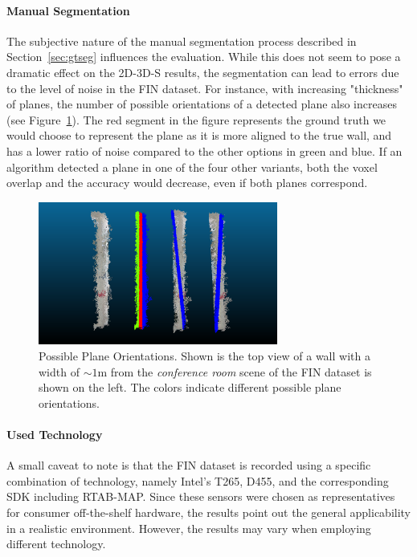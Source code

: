 \documentclass[main.tex]{subfiles}
\begin{document}
\paragraph{Manual Segmentation}
The subjective nature of the manual segmentation process described in Section~\ref{sec:gtseg} influences the evaluation. While this does not seem to pose a dramatic effect on the 2D-3D-S results, the segmentation can lead to errors due to the level of noise in the FIN dataset. For instance, with increasing "thickness" of planes, the number of possible orientations of a detected plane also increases (see Figure~\ref{fig:poss-planes}). The red segment in the figure represents the ground truth we would choose to represent the plane as it is more aligned to the true wall, and has a lower ratio of noise compared to the other options in green and blue. If an algorithm detected a plane in one of the four other variants, both the voxel overlap and the accuracy would decrease, even if both planes correspond.

\begin{figure}[]
    \centering
    \includegraphics[width=0.7\textwidth]{images/possible_planes.png}
    \caption[Plane Orientation Ambiguity]{Possible Plane Orientations. Shown is the top view of a wall with a width of ${\sim}1$m from the \textit{conference room} scene of the FIN dataset is shown on the left. The colors indicate different possible plane orientations.}
    \label{fig:poss-planes}
\end{figure}


\paragraph{Used Technology}
A small caveat to note is that the FIN dataset is recorded using a specific combination of technology, namely Intel's T265, D455, and the corresponding SDK including RTAB-MAP.
Since these sensors were chosen as representatives for consumer off-the-shelf hardware, the results point out the general applicability in a realistic environment. However, the results may vary when employing different technology. 
\end{document}
